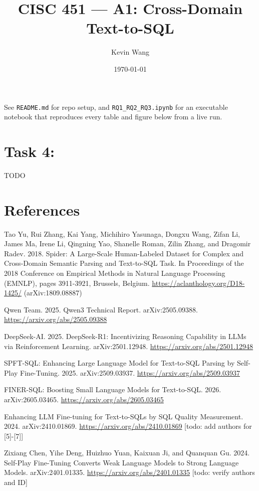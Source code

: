 \documentclass[11pt]{article}
\title{CISC 451 --- A1: Cross-Domain Text-to-SQL}
\author{Kevin Wang}
\date{\today}
\begin{document}
\maketitle

See \texttt{README.md} for repo setup, and \texttt{RQ1\_RQ2\_RQ3.ipynb} for an executable
notebook that reproduces every table and figure below from a live run.







\section*{Task 4:}

TODO

\section*{References}

\begin{enumerate}[leftmargin=2.2em, label={[\arabic*]}]
\item Tao Yu, Rui Zhang, Kai Yang, Michihiro Yasunaga, Dongxu Wang, Zifan Li, James Ma, Irene Li, Qingning Yao, Shanelle Roman, Zilin Zhang, and Dragomir Radev. 2018. Spider: A Large-Scale Human-Labeled Dataset for Complex and Cross-Domain Semantic Parsing and Text-to-SQL Task. In Proceedings of the 2018 Conference on Empirical Methods in Natural Language Processing (EMNLP), pages 3911-3921, Brussels, Belgium. \url{https://aclanthology.org/D18-1425/} (arXiv:1809.08887)
\setcounter{enumi}{1}
\item Qwen Team. 2025. Qwen3 Technical Report. arXiv:2505.09388. \url{https://arxiv.org/abs/2505.09388}
\setcounter{enumi}{3}
\item DeepSeek-AI. 2025. DeepSeek-R1: Incentivizing Reasoning Capability in LLMs via Reinforcement Learning. arXiv:2501.12948. \url{https://arxiv.org/abs/2501.12948}
\item SPFT-SQL: Enhancing Large Language Model for Text-to-SQL Parsing by Self-Play Fine-Tuning. 2025. arXiv:2509.03937. \url{https://arxiv.org/abs/2509.03937}
\item FINER-SQL: Boosting Small Language Models for Text-to-SQL. 2026. arXiv:2605.03465. \url{https://arxiv.org/abs/2605.03465}
\item Enhancing LLM Fine-tuning for Text-to-SQLs by SQL Quality Measurement. 2024. arXiv:2410.01869. \url{https://arxiv.org/abs/2410.01869} [todo: add authors for [5]-[7]]
\item Zixiang Chen, Yihe Deng, Huizhuo Yuan, Kaixuan Ji, and Quanquan Gu. 2024. Self-Play Fine-Tuning Converts Weak Language Models to Strong Language Models. arXiv:2401.01335. \url{https://arxiv.org/abs/2401.01335} [todo: verify authors and ID]
\end{enumerate}
\end{document}
